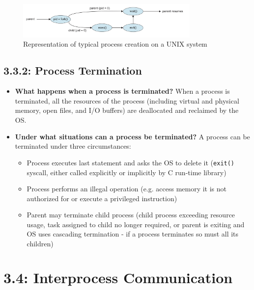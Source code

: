 \documentclass[12pt]{article}
\begin{document}
\begin{itemize}
        \begin{figure}[ht]
            \centering
            \includegraphics[width=0.8\textwidth]{figures/unix-process-creation.jpg}
            \caption{Representation of typical process creation on a UNIX system}
            \label{fig:unix-process-creation}
        \end{figure}
\end{itemize}

\subsection*{3.3.2: Process Termination}

\begin{itemize}
    \item \textbf{What happens when a process is terminated?} When a process is terminated, all the resources of the process (including virtual and physical memory, open files, and I/O buffers) are deallocated and reclaimed by the OS.
    \item \textbf{Under what situations can a process be terminated?} A process can be terminated under three circumstances:
        \begin{itemize}
            \item Process executes last statement and asks the OS to delete it (\texttt{exit()} syscall, either called explicitly or implicitly by C run-time library)
            \item Process performs an illegal operation (e.g. access memory it is not authorized for or execute a privileged instruction)
            \item Parent may terminate child process (child process exceeding resource usage, task assigned to child no longer required, or parent is exiting and OS uses cascading termination - if a process terminates so must all its children)
        \end{itemize}
\end{itemize}

\section*{3.4: Interprocess Communication}
\end{document}
